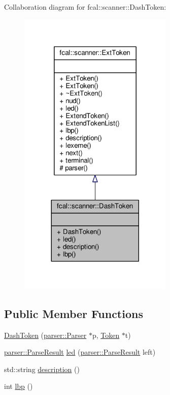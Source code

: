 Collaboration diagram for fcal\+:\+:scanner\+:\+:Dash\+Token\+:
\nopagebreak
\begin{figure}[H]
\begin{center}
\leavevmode
\includegraphics[width=209pt]{classfcal_1_1scanner_1_1DashToken__coll__graph}
\end{center}
\end{figure}
\subsection*{Public Member Functions}
\begin{DoxyCompactItemize}
\item 
\hyperlink{classfcal_1_1scanner_1_1DashToken_afaabbf1a78e35a4592cd8a5e1bfab79f}{Dash\+Token} (\hyperlink{classfcal_1_1parser_1_1Parser}{parser\+::\+Parser} $\ast$p, \hyperlink{classfcal_1_1scanner_1_1Token}{Token} $\ast$t)
\item 
\hyperlink{classfcal_1_1parser_1_1ParseResult}{parser\+::\+Parse\+Result} \hyperlink{classfcal_1_1scanner_1_1DashToken_a7c0e98c83937cf698ce6f32380e17c52}{led} (\hyperlink{classfcal_1_1parser_1_1ParseResult}{parser\+::\+Parse\+Result} left)
\item 
std\+::string \hyperlink{classfcal_1_1scanner_1_1DashToken_a87476e28739d1c9966ed330ba8154342}{description} ()
\item 
int \hyperlink{classfcal_1_1scanner_1_1DashToken_a1b88432765ae6c30be1250015ebaa2c4}{lbp} ()
\end{DoxyCompactItemize}
